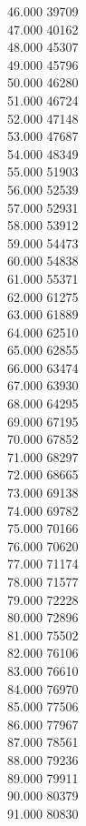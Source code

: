 { 46.000	39709 \\
 47.000	40162 \\
 48.000	45307 \\
 49.000	45796 \\
 50.000	46280 \\
 51.000	46724 \\
 52.000	47148 \\
 53.000	47687 \\
 54.000	48349 \\
 55.000	51903 \\
 56.000	52539 \\
 57.000	52931 \\
 58.000	53912 \\
 59.000	54473 \\
 60.000	54838 \\
 61.000	55371 \\
 62.000	61275 \\
 63.000	61889 \\
 64.000	62510 \\
 65.000	62855 \\
 66.000	63474 \\
 67.000	63930 \\
 68.000	64295 \\
 69.000	67195 \\
 70.000	67852 \\
 71.000	68297 \\
 72.000	68665 \\
 73.000	69138 \\
 74.000	69782 \\
 75.000	70166 \\
 76.000	70620 \\
 77.000	71174 \\
 78.000	71577 \\
 79.000	72228 \\
 80.000	72896 \\
 81.000	75502 \\
 82.000	76106 \\
 83.000	76610 \\
 84.000	76970 \\
 85.000	77506 \\
 86.000	77967 \\
 87.000	78561 \\
 88.000	79236 \\
 89.000	79911 \\
 90.000	80379 \\
 91.000	80830 \\
}
